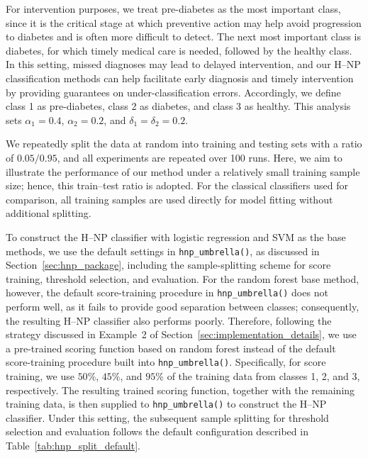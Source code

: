 For intervention purposes, we treat pre-diabetes as the most important class, since it is the critical stage at which preventive action may help avoid progression to diabetes and is often more difficult to detect. The next most important class is diabetes, for which timely medical care is needed, followed by the healthy class. In this setting, missed diagnoses may lead to delayed intervention, and our H--NP classification methods can help facilitate early diagnosis and timely intervention by providing guarantees on under-classification errors. Accordingly, we define class 1 as pre-diabetes, class 2 as diabetes, and class 3 as healthy. This analysis sets \(\alpha_1 = 0.4\), \(\alpha_2 = 0.2\), and \(\delta_1 = \delta_2 = 0.2\).



We repeatedly split the data at random into training and testing sets with a ratio of \(0.05/0.95\), and all experiments are repeated over 100 runs. Here, we aim to illustrate the performance of our method under a relatively small training sample size; hence, this train--test ratio is adopted. For the classical classifiers used for comparison, all training samples are used directly for model fitting without additional splitting.



To construct the H--NP classifier with logistic regression and SVM as the base methods, we use the default settings in \texttt{hnp\_umbrella()}, as discussed in Section~\ref{sec:hnp_package}, including the sample-splitting scheme for score training, threshold selection, and evaluation. For the random forest base method, however, the default score-training procedure in \texttt{hnp\_umbrella()} does not perform well, as it fails to provide good separation between classes; consequently, the resulting H--NP classifier also performs poorly. Therefore, following the strategy discussed in Example~2 of Section~\ref{sec:implementation_details}, we use a pre-trained scoring function based on random forest instead of the default score-training procedure built into \texttt{hnp\_umbrella()}. Specifically, for score training, we use \(50\%\), \(45\%\), and \(95\%\) of the training data from classes 1, 2, and 3, respectively. The resulting trained scoring function, together with the remaining training data, is then supplied to \texttt{hnp\_umbrella()} to construct the H--NP classifier. Under this setting, the subsequent sample splitting for threshold selection and evaluation follows the default configuration described in Table~\ref{tab:hnp_split_default}. 


